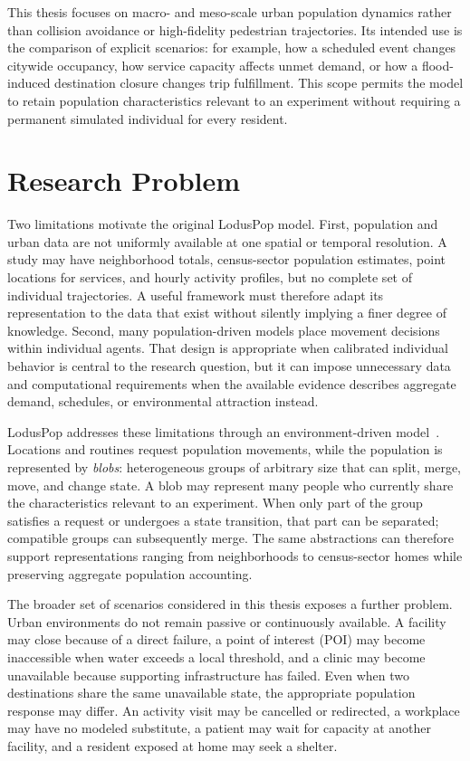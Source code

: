 This thesis focuses on macro- and meso-scale urban population dynamics rather than collision avoidance or high-fidelity pedestrian trajectories. Its intended use is the comparison of explicit scenarios: for example, how a scheduled event changes citywide occupancy, how service capacity affects unmet demand, or how a flood-induced destination closure changes trip fulfillment. This scope permits the model to retain population characteristics relevant to an experiment without requiring a permanent simulated individual for every resident.

\section{Research Problem}
\label{sec:introduction_problem}

Two limitations motivate the original LodusPop model. First, population and urban data are not uniformly available at one spatial or temporal resolution. A study may have neighborhood totals, census-sector population estimates, point locations for services, and hourly activity profiles, but no complete set of individual trajectories. A useful framework must therefore adapt its representation to the data that exist without silently implying a finer degree of knowledge. Second, many population-driven models place movement decisions within individual agents. That design is appropriate when calibrated individual behavior is central to the research question, but it can impose unnecessary data and computational requirements when the available evidence describes aggregate demand, schedules, or environmental attraction instead.

LodusPop addresses these limitations through an environment-driven model~\cite{silva2026lodusPop}. Locations and routines request population movements, while the population is represented by \emph{blobs}: heterogeneous groups of arbitrary size that can split, merge, move, and change state. A blob may represent many people who currently share the characteristics relevant to an experiment. When only part of the group satisfies a request or undergoes a state transition, that part can be separated; compatible groups can subsequently merge. The same abstractions can therefore support representations ranging from neighborhoods to census-sector homes while preserving aggregate population accounting.

The broader set of scenarios considered in this thesis exposes a further problem. Urban environments do not remain passive or continuously available. A facility may close because of a direct failure, a point of interest (POI) may become inaccessible when water exceeds a local threshold, and a clinic may become unavailable because supporting infrastructure has failed. Even when two destinations share the same unavailable state, the appropriate population response may differ. An activity visit may be cancelled or redirected, a workplace may have no modeled substitute, a patient may wait for capacity at another facility, and a resident exposed at home may seek a shelter.

